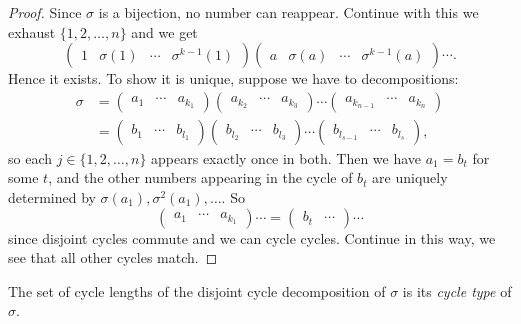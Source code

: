 \documentclass[a4paper]{article}
\begin{document}
\begin{proof}
        Since $ \sigma $ is a bijection, no number can reappear. Continue with this we exhaust $\{1,2,\dots,n\}$ and we get 
        \[
            \begin{pmatrix}
                1&\sigma(1)&\cdots&\sigma^{k-1}(1)
            \end{pmatrix}
            \begin{pmatrix}
                a&\sigma(a)&\cdots&\sigma^{k-1}(a)
            \end{pmatrix}
            \cdots
        .\]
        Hence it exists. To show it is unique, suppose we have to decompositions:
        \[
            \begin{aligned}
                 \sigma&= \begin{pmatrix} a_1&\cdots&a_{k_1} \end{pmatrix}\begin{pmatrix} a_{k_2}&\cdots&a_{k_3} \end{pmatrix}\cdots \begin{pmatrix} a_{k_{n-1}}&\cdots&a_{k_n} \end{pmatrix}\\
                 &= \begin{pmatrix} b_1&\cdots&b_{l_1} \end{pmatrix}\begin{pmatrix} b_{l_2}&\cdots&b_{l_3} \end{pmatrix}\cdots \begin{pmatrix} b_{l_{s-1}}&\cdots&b_{l_s} \end{pmatrix},
            \end{aligned}
        \]
        so each $ j\in \{1,2,\dots,n\} $ appears exactly once in both. Then we have $ a_1=b_t $ for some $t$, and the other numbers appearing in the cycle of $b_t$ are uniquely determined by $ \sigma(a_1),\sigma^2(a_1),\dots $. So
        \[
            \begin{pmatrix} a_1&\cdots&a_{k_1} \end{pmatrix}\cdots = \begin{pmatrix} b_t&\cdots \end{pmatrix}\cdots
        \]
        since disjoint cycles commute and we can cycle cycles. Continue in this way, we see that all other cycles match. 
    \end{proof}
    \begin{definition}
        The set of cycle lengths of the disjoint cycle decomposition of $ \sigma $ is its \textit{cycle type} of $\sigma$.
    \end{definition}
\end{document}
